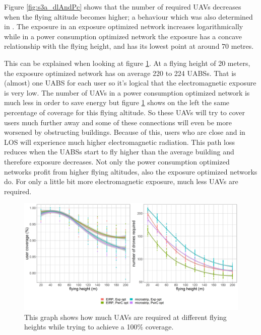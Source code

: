 Figure \ref{fig:s3a_dlAndPc} shows that the number of required \gls{UAV}s decreases when the flying altitude becomes higher;
a behaviour which was also determined in \cite{J2}.
The exposure in an exposure optimized network increases logarithmically while in a power consumption optimized network the exposure has a concave relationship with the flying height, and has its lowest point at around 70 metres.

This can be explained when looking at figure \ref{fig:s3a_numDronesAndCov}.
At a flying height of 20 meters, the exposure optimized network has on average 220 to 224 \gls{UABS}s. That is (almost) one \gls{UABS} for each user
so it's logical that the electromagnetic exposure is very low.
The number of \gls{UAV}s in a power consumption optimized network is much less in order 
to save energy but figure \ref{fig:s3a_numDronesAndCov} shows on the left the same percentage of coverage for this flying altitude.
So these \gls{UAV}s will try to cover users much further away and some of these connections will even be more worsened by obstructing buildings.
Because of this, users who are close and in \gls{LOS} will experience much higher electromagnetic radiation.
This path loss reduces when the \gls{UABS}s start to fly higher than the average building and therefore exposure decreases.
Not only the power consumption optimized networks profit from higher flying altitudes, also the exposure optimized networks do. For only a little bit 
more electromagnetic exposure, much less \gls{UAV}s are required.

\begin{figure}[]
  \includegraphics[width=\textwidth]{../results/s3/fhvsnumdronesAndCov.png}
  \caption{This graph shows how much \gls{UAV}s are required at different flying heights while trying to achieve a 100\% coverage.}
  \label{fig:s3a_numDronesAndCov}
\end{figure}

